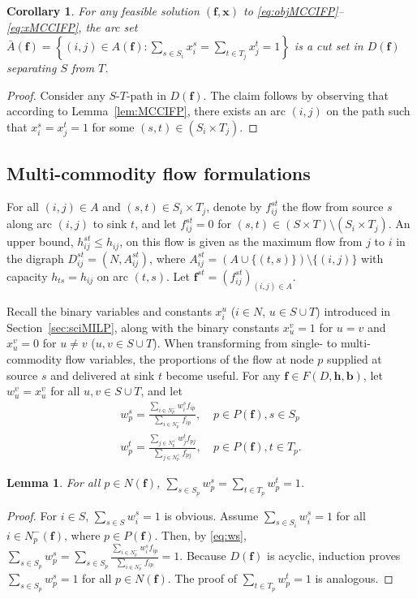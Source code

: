 \documentclass[pdflatex,sn-mathphys-num]{sn-jnl}%
\theoremstyle{thmstyleone}%
\newtheorem{lemma}[theorem]{Lemma}%
\newtheorem{corollary}[theorem]{Corollary}%
\begin{document}
\begin{corollary} \label{cor:MCCIFP}
For any feasible solution $(\boldsymbol{f},\boldsymbol{x})$ to \eqref{eq:objMCCIFP}--\eqref{eq:xMCCIFP},
the arc set $\bar{A}(\boldsymbol{f})=\left\{(i,j)\in A(\boldsymbol{f}):\sum_{s\in S_i}x_i^s=\sum_{t\in T_j}x_j^t=1\right\}$ is a cut set in $D(\boldsymbol{f})$ separating $S$ from $T$.
\end{corollary}
\begin{proof}
Consider any $S$-$T$-path in $D(\boldsymbol{f})$.
The claim follows by observing that according to Lemma~\ref{lem:MCCIFP}, there exists an arc $(i,j)$ on the path such that $x_i^s=x_j^t=1$ for some $(s,t)\in(S_i\times T_j)$.
\end{proof}

\subsection{Multi-commodity flow formulations} \label{sec:mciMILP}
For all $(i,j)\in A$ and $(s,t)\in S_i\times T_j$, denote by $f_{ij}^{st}$ the flow from source $s$ along arc $(i,j)$ to sink $t$,
and let $f_{ij}^{st}=0$ for $(s,t)\in (S\times T)\setminus(S_i\times T_j)$.
An upper bound, $h_{ij}^{st}\leq h_{ij}$, on this flow is given as the maximum flow from $j$ to $i$ in the digraph $D_{ij}^{st}=(N,A_{ij}^{st})$,
where $A_{ij}^{st}=\left(A\cup\{(t,s)\}\right)\setminus\{(i,j)\}$ with capacity $h_{ts}=h_{ij}$ on arc $(t,s)$.
Let $\boldsymbol{f}^{st}=\left(f_{ij}^{st}\right)_{(i,j)\in A}$.

Recall the binary variables and constants $x_i^u$ ($i\in N$, $u\in S\cup T$) introduced in Section~\ref{sec:sciMILP},
along with the binary constants $x_u^v=1$ for $u=v$ and $x_u^v=0$ for $u\neq v$ ($u,v\in S\cup T$).
When transforming from single- to multi-commodity flow variables, the proportions of the flow at node $p$ supplied at source $s$ and delivered at sink $t$ become useful.
For any $\boldsymbol{f}\in F(D,\boldsymbol{h},\boldsymbol{b})$, let $w_u^v=x_u^v$ for all $u,v\in S\cup T$, and let
\begin{eqnarray}
w_p^s = \frac{\sum_{i\in N_p^-}w_i^sf_{ip}}{\sum_{i\in N_p^-}f_{ip}}, & ~p\in P(\boldsymbol{f}), s\in S_p \label{eq:ws} \\
w_p^t = \frac{\sum_{j\in N_p^+}w_j^tf_{pj}}{\sum_{j\in N_p^+}f_{pj}}, & ~p\in P(\boldsymbol{f}), t\in T_p. \label{eq:wt}
\end{eqnarray}

\begin{lemma} \label{lem:w}
For all $p\in N(\boldsymbol{f})$, $\sum_{s\in S_p}w_p^s=\sum_{t\in T_p}w_p^t=1$.
\end{lemma}
\begin{proof}
For $i\in S$, $\sum_{s\in S}w_i^s=1$ is obvious. 
Assume $\sum_{s\in S_i}w_i^s=1$ for all $i\in N_p^-(\boldsymbol{f})$, where $p\in P(\boldsymbol{f})$.
Then, by \eqref{eq:ws}, $\sum_{s\in S_p}w_p^s=\sum_{s\in S_p}\frac{\sum_{i\in N_p^-}w_i^sf_{ip}}{\sum_{i\in N_p^-}f_{ip}}=1$.
Because $D(\boldsymbol{f})$ is acyclic, induction proves $\sum_{s\in S_p}w_p^s=1$ for all $p\in N(\boldsymbol{f})$.
The proof of $\sum_{t\in T_p}w_p^t=1$ is analogous.
\end{proof}
\end{document}
